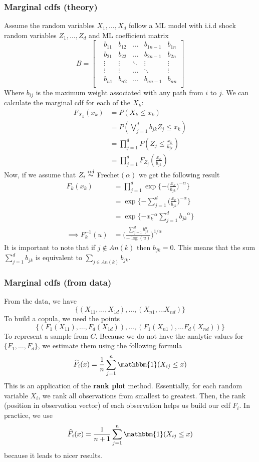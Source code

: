 \documentclass[12pt]{article}
\def\inv{^{-1}}
\newcommand{\ds}{\displaystyle}
\theoremstyle{definition}
\theoremstyle{definition}
\begin{document}
\subsubsection{Marginal cdfs (theory)}
Assume the random variables $X_1,\hdots, X_d$ follow a ML model with i.i.d shock random variables $Z_1,\hdots, Z_d$ and ML coefficient matrix 
\[ B=\begin{bmatrix}
&b_{11} &b_{12}&\hdots& b_{1n-1}& b_{1n}\\
&b_{21} &b_{22}&\hdots& b_{2n-1}& b_{2n}\\
&\vdots&\vdots&\ddots & \vdots& \vdots \\
&\vdots&\vdots&\hdots & \ddots& \vdots \\
&b_{n1}& b_{n2} & \hdots &b_{nn-1}& b_{nn}\\
\end{bmatrix}
\]
Where $b_{ij}$ is the maximum weight associated with any path from $i$ to $j$. We can calculate the marginal cdf for each of the $X_k$:
\begin{align*}
    F_{X_k}(x_k)&=P(X_k\leq x_k)\\
    &=P(\bigvee_{j=1}^db_{jk}Z_j\leq x_k)\\
    &=\prod_{j=1}^dP(Z_j\leq \frac{x_k}{b_{jk}})\\
    &=\prod_{j=1}^dF_{Z_j}( \frac{x_k}{b_{jk}})
\end{align*}
Now, if we assume that $Z_i\overset{iid}{\thicksim}$ Frechet$(\alpha)$ we get the following result
\begin{align*}
    F_{k}(x_k)&=\prod_{j=1}^d\exp\bigg\{{-\big(\frac{x_k}{b_{jk}}}\big)^{-\alpha}\bigg\}\\
    &=\exp\bigg\{{-\sum_{j=1}^d\big(\frac{x_k}{b_{jk}}}\big)^{-\alpha}\bigg\}\\
    &=\exp\bigg\{{-x_k^{-\alpha}\sum_{j=1}^d{b_{jk}}^{\alpha}}\bigg\}\\
    \implies F_{k}\inv(u)&=\bigg(\frac{\sum_{j=1}^d{b_{jk}^\alpha}}{-\log(u)} \bigg)^{{1}/{\alpha}}
\end{align*}
It is important to note that if $j\notin An(k)$ then $b_{jk}=0$. This means that the sum $\ds \sum_{j=1}^d{b_{jk}}$ is equivalent to $\ds \sum_{j\in An(k)}{b_{jk}}$.
\subsubsection{Marginal cdfs (from data)}
From the data, we have $$\{(X_{11},\hdots,X_{1d}), \hdots, (X_{n1}, \hdots X_{nd})\}$$To build a copula, we need the points 
$$\{(F_1(X_{11}),\hdots,F_d(X_{1d})), \hdots, (F_1(X_{n1}), \hdots F_d(X_{nd}))\}$$
To represent a sample from $C$. Because we do not have the analytic values for $\{F_1,\hdots,F_d\}$, we estimate them using the following formula
$$\widehat{F}_i(x)=\frac{1}{n}\sum_{j=1}^n\mathbbm{1}(X_{ij}\leq x)$$
This is an application of the \textbf{rank plot} method. Essentially, for each random variable $X_{i}$, we rank all observations from smallest to greatest. Then, the rank (position in observation vector) of each observation helps us build our cdf $F_i$. In practice, we use 
$$\widehat{F}_i(x)=\frac{1}{n+1}\sum_{j=1}^n\mathbbm{1}(X_{ij}\leq x)$$
because it leads to nicer results.
\end{document}
